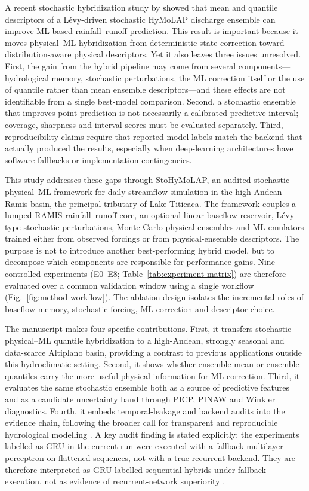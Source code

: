 \documentclass[a4paper,fleqn]{cas-sc}
\begin{document}
A recent stochastic hybridization study by
\citet{houenafa2025hybridization} showed that mean and quantile
descriptors of a L\'{e}vy-driven stochastic HyMoLAP discharge ensemble
can improve ML-based rainfall--runoff prediction. This result is
important because it moves physical--ML hybridization from deterministic
state correction toward distribution-aware physical descriptors. Yet it
also leaves three issues unresolved. First, the gain from the hybrid
pipeline may come from several components---hydrological memory,
stochastic perturbations, the ML correction itself or the use of
quantile rather than mean ensemble descriptors---and these effects are
not identifiable from a single best-model comparison. Second, a
stochastic ensemble that improves point prediction is not necessarily a
calibrated predictive interval; coverage, sharpness and interval scores
must be evaluated separately. Third, reproducibility claims require that
reported model labels match the backend that actually produced the
results, especially when deep-learning architectures have software
fallbacks or implementation contingencies.

This study addresses these gaps through StoHyMoLAP, an audited
stochastic physical--ML framework for daily streamflow simulation in the
high-Andean Ramis basin, the principal tributary of Lake Titicaca. The
framework couples a lumped RAMIS rainfall--runoff core, an optional
linear baseflow reservoir, L\'{e}vy-type stochastic perturbations,
Monte Carlo physical ensembles and ML emulators trained either from
observed forcings or from physical-ensemble descriptors. The purpose is
not to introduce another best-performing hybrid model, but to decompose
which components are responsible for performance gains. Nine controlled
experiments (E0--E8; Table~\ref{tab:experiment-matrix}) are therefore
evaluated over a common validation window using a single workflow
(Fig.~\ref{fig:method-workflow}). The ablation design isolates the
incremental roles of baseflow memory, stochastic forcing, ML correction
and descriptor choice.

The manuscript makes four specific contributions. First, it transfers
stochastic physical--ML quantile hybridization to a high-Andean,
strongly seasonal and data-scarce Altiplano basin, providing a contrast
to previous applications outside this hydroclimatic setting. Second, it
shows whether ensemble mean or ensemble quantiles carry the more useful
physical information for ML correction. Third, it evaluates the same
stochastic ensemble both as a source of predictive features and as a
candidate uncertainty band through PICP, PINAW and Winkler diagnostics.
Fourth, it embeds temporal-leakage and backend audits into the evidence
chain, following the broader call for transparent and reproducible
hydrological modelling \citep{hall2021hydrologist}. A key audit finding
is stated explicitly: the experiments labelled as GRU in the current
run were executed with a fallback multilayer perceptron on flattened
sequences, not with a true recurrent backend. They are therefore
interpreted as GRU-labelled sequential hybrids under fallback execution,
not as evidence of recurrent-network superiority
\citep{kratzert2018rainfall}.
\end{document}
